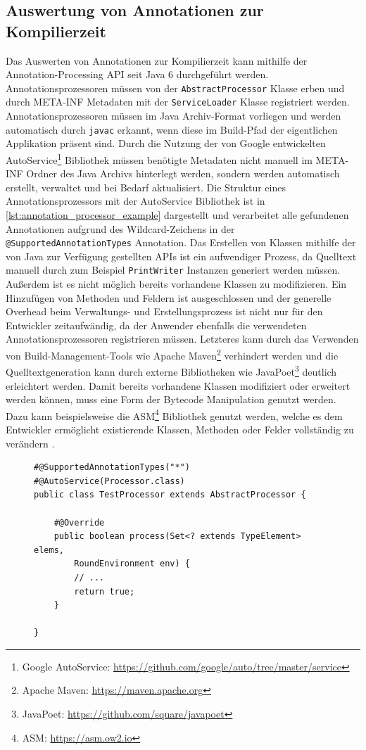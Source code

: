\subsection{Auswertung von Annotationen zur Kompilierzeit}
Das Auswerten von Annotationen zur Kompilierzeit kann mithilfe der Annotation-Processing API seit Java 6 durchgeführt werden. Annotationsprozessoren müssen von der \texttt{AbstractProcessor} Klasse erben und durch META-INF Metadaten mit der \texttt{ServiceLoader} Klasse registriert werden. Annotationsprozessoren müssen im Java Archiv-Format vorliegen und werden automatisch durch \texttt{javac} erkannt, wenn diese im Build-Pfad der eigentlichen Applikation präsent sind. Durch die Nutzung der von Google entwickelten AutoService\footnote{Google AutoService: \url{https://github.com/google/auto/tree/master/service}} Bibliothek müssen benötigte Metadaten nicht manuell im META-INF Ordner des Java Archivs hinterlegt werden, sondern werden automatisch erstellt, verwaltet und bei Bedarf aktualisiert. Die Struktur eines Annotationsprozessors mit der AutoService Bibliothek ist in \autoref{lst:annotation_processor_example} dargestellt und verarbeitet alle gefundenen Annotationen aufgrund des Wildcard-Zeichens in der \texttt{@SupportedAnnotationTypes} Annotation. Das Erstellen von Klassen mithilfe der von Java zur Verfügung gestellten APIs ist ein aufwendiger Prozess, da Quelltext manuell durch zum Beispiel \texttt{PrintWriter} Instanzen generiert werden müssen. Außerdem ist es nicht möglich bereits vorhandene Klassen zu modifizieren. Ein Hinzufügen von Methoden und Feldern ist ausgeschlossen und der generelle Overhead beim Verwaltungs- und Erstellungsprozess ist nicht nur für den Entwickler zeitaufwändig, da der Anwender ebenfalls die verwendeten Annotationsprozessoren registrieren müssen. Letzteres kann durch das Verwenden von Build-Management-Tools wie Apache Maven\footnote{\label{ft:maven}Apache Maven: \url{https://maven.apache.org}} verhindert werden und die Quelltextgeneration kann durch externe Bibliotheken wie JavaPoet\footnote{JavaPoet: \url{https://github.com/square/javapoet}} deutlich erleichtert werden. Damit bereits vorhandene Klassen modifiziert oder erweitert werden können, muss eine Form der Bytecode Manipulation genutzt werden. Dazu kann beispielsweise die ASM\footnote{\label{ft:asm}ASM: \url{https://asm.ow2.io}} Bibliothek genutzt werden, welche es dem Entwickler ermöglicht existierende Klassen, Methoden oder Felder vollständig zu verändern \cite{Kuleshov2007}.
\begin{figure}[H]
	\begin{lstlisting}[caption={Beispiel -- Annotationsprozessor.}, captionpos=b, label=lst:annotation_processor_example]
#@SupportedAnnotationTypes("*")
#@AutoService(Processor.class)
public class TestProcessor extends AbstractProcessor {
	
	#@Override
	public boolean process(Set<? extends TypeElement> elems,
		RoundEnvironment env) {
		// ...
		return true;
	}
	
}
	\end{lstlisting}
\end{figure}